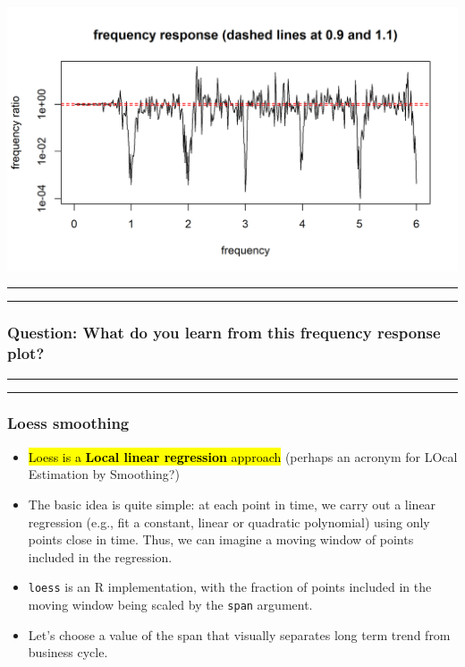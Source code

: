 \documentclass[]{article}
\begin{document}
\begin{center}\includegraphics{figure/intro-s_transfer-1} \end{center}

\begin{center}\rule{0.5\linewidth}{\linethickness}\end{center}

\begin{center}\rule{0.5\linewidth}{\linethickness}\end{center}

\subsubsection{Question: What do you learn from this frequency response
plot?}\label{question-what-do-you-learn-from-this-frequency-response-plot}

\begin{center}\rule{0.5\linewidth}{\linethickness}\end{center}

\begin{center}\rule{0.5\linewidth}{\linethickness}\end{center}

\subsubsection{Loess smoothing}\label{loess-smoothing}

\begin{itemize}
\item
  \hl{Loess is a \textbf{Local linear regression} approach} (perhaps an
  acronym for LOcal Estimation by Smoothing?)
\item
  The basic idea is quite simple: at each point in time, we carry out a
  linear regression (e.g., fit a constant, linear or quadratic
  polynomial) using only points close in time. Thus, we can imagine a
  moving window of points included in the regression.
\item
  \texttt{loess} is an R implementation, with the fraction of points
  included in the moving window being scaled by the \texttt{span}
  argument.
\item
  Let's choose a value of the span that visually separates long term
  trend from business cycle.
\end{itemize}
\end{document}

